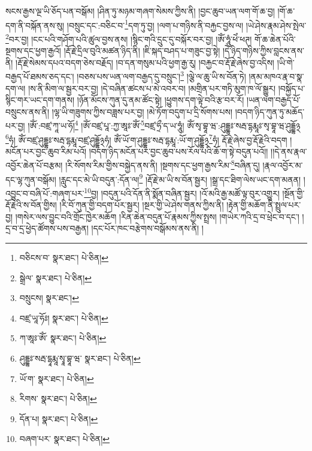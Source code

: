 སངས་རྒྱས་ལྔ་ཡི་ཅོད་པན་བསྒོམ། །ཤིན་ཏུ་མཉམ་གཞག་སེམས་ཀྱིས་ནི། །བྱང་ཆུབ་ཡན་ལག་གོ་ཆ་བྱ། །གོ་ཆ་དག་ནི་བསྐོན་ནས་སུ། །བསྲུང་དང་:བཅིང་བ་\footnote{བཅིངས་བ་  སྣར་ཐང་།  པེ་ཅིན། }དག་ཏུ་བྱ། །ལག་པ་གཉིས་ནི་བརྐྱང་བྱས་ལ། །ཡེ་ཤེས་རྣམ་ཤེས་སྤེལ་\footnote{སྒྲེལ་  སྣར་ཐང་།  པེ་ཅིན། }བར་བྱ། །ངང་པའི་གཤོག་པའི་ཚུལ་བྱས་ནས། །སྙིང་གའི་དྲུང་དུ་བསྐོར་བར་བྱ། །ཨོཾ་ཧཱུཾ་ཕེཾ་ཕཊ། གོ་ཆ་ཆེན་པོའི་སྔགས་དང་ཕྱག་རྒྱའོ། །རྡོ་རྗེ་དྲིལ་བུའི་མཚན་ཉིད་ནི། །ཇི་སྐད་བཤད་པ་གཟུང་བྱ་སྟེ། །དེ་ཉིད་གཉིས་ཀྱིས་བླངས་ནས་ནི། །རྡོ་རྗེ་སེམས་དཔའ་བདག་ཅེས་བརྗོད། །བ་དན་གསུམ་པའི་ཕྱག་རྒྱ་རུ། །བརྐྱང་བ་རྡོ་རྗེ་ཞེས་བྱ་འདིས། །ཡི་གེ་བརྒྱད་པོ་ཐམས་ཅད་དང་། །བཅས་པས་ཡན་ལག་བརྒྱད་དུ་བསྲུང་།\footnote{བསྲུངས།  སྣར་ཐང་། } །ལྕེ་ལ་ཆུ་ཡི་ས་བོན་ཏེ། །ནམ་མཁའ་རྣ་བ་སྣ་དག་ལ། །ས་ནི་མིག་ལ་སྦྱར་བར་བྱ། །དེ་བཞིན་ཚངས་པ་མེ་འབར་བ། །མགྲིན་པར་གཏི་མུག་ཁ་ལོ་སྒྱུར། །བསྐྱོད་པ་སྙིང་གར་ཡང་དག་གནས། །ཉོན་མོངས་ཀུན་དུ་ནམ་ཚོང་སྟེ། །ཕྱུགས་དག་ལྟེ་བའི་རྩ་བར་རོ། །ཡན་ལག་བརྒྱད་པོ་བསྲུངས་ནས་ནི། །ལྷ་ཡི་གཟུགས་ཀྱིས་བཟླས་པར་བྱ། །མེ་ཏོག་བདུག་པ་དྲི་སོགས་པས། །བདག་ཉིད་ཀུན་ཏུ་མཆོད་པར་བྱ། །ཨོཾ་:བཛྲ་ཀཱ་ཡ་ཧོ།\footnote{བཛྲ་ཡཱ་ཧོཿ།  སྣར་ཐང་།  པེ་ཅིན། } །ཨོཾ་བཛྲ་པཱ་:ཀྱ་ཨཱཿ་ཨོཾ་\footnote{ཀ་ཨཱཿ་ཨོཾ་  སྣར་ཐང་།  པེ་ཅིན། }བཛྲ་ཧྲྀ་ད་ཡ་ཧཱུཾ། ཨོཾ་སྭ་བྷཱ་ཝ་:ཤུདྡྷཿ་སརྦ་དྷརྨཱཿ་སྭ་བྷཱ་ཝ་ཤུདྡྷོ྅\footnote{ཤུདྡྷཿ་སརྦ་དྷཱརྨཱ་སྭཱ་བྷཱ་ཝ་  སྣར་ཐང་།  པེ་ཅིན། }ཧཾ། ཨོཾ་བཛྲ་ཤུདྡྷཿ་སརྦ་དྷརྨཱ་བཛྲ་ཤུདྡྷོ྅ཧཾ། ཨོཾ་ཡོ་ག་ཤུདྡྷཿ་སརྦ་དྷརྨཱ་:ཡོ་ག་ཤུདྡྷོ྅\footnote{ཡོ་ག་  སྣར་ཐང་།  པེ་ཅིན། }ཧཾ། རྡོ་རྗེ་ཞེས་བྱ་རྡོ་རྗེའི་བདག །མངོན་པར་བྱང་ཆུབ་རིམ་པའོ། །བདག་ཉིད་མངོན་པར་བྱང་ཆུབ་པས་རོལ་པའི་ཆོ་ག་སྟེ་བདུན་པའོ།། །།དེ་ནས་རྣལ་འབྱོར་ཆེན་པོ་བརྩམ། །རི་སོགས་རིམ་གྱིས་བསྐྱེད་ནས་ནི། །སྔགས་དང་ཕྱག་རྒྱས་རིམ་\footnote{རིགས་  སྣར་ཐང་།  པེ་ཅིན། }བཞིན་དུ། །རྣལ་འབྱོར་མ་དང་ལྷ་ཀུན་བསྒོམ། །རླུང་དང་མེ་ཡི་བདུན་:དོན་ལ།\footnote{དོན་པ།  སྣར་ཐང་།  པེ་ཅིན། } །རྡོ་རྗེ་མ་ཡི་ས་བོན་སྦྱར། །སྒྲ་དང་ཐིག་ལེས་ཡང་དག་མནན། །འབྱུང་བ་བཞི་པོ་:གཞག་པར་\footnote{བཞག་པར་  སྣར་ཐང་།  པེ་ཅིན། }བྱ། །བདུན་པའི་དོན་ནི་སྨོན་བཞིན་སྦྱར། །འོ་མའི་རྒྱ་མཚོ་ལྟ་བུར་འགྱུར། །སྔོན་གྱི་རྡོ་རྗེའི་ས་བོན་གྱིས། །རི་བོ་ཀུན་གྱི་བདག་པོར་སྦྱར། །སྔར་གྱི་ཡེ་ཤེས་གནས་ཀྱིས་ནི། །རྟེན་གྱི་མཆོག་ནི་སྤྲུལ་པར་བྱ། །གསེར་ལས་བྱུང་བའི་གྲོང་ཁྱེར་མཆོག །རིན་ཆེན་བདུན་པོ་རྣམས་ཀྱིས་སྤྲས། །གཡེར་ཀའི་དྲ་བ་ཕྲེང་བ་དང་། །དྲ་བ་དྲ་ཕྱེད་ཚོགས་པས་བརྒྱན། །དང་པོར་ཁང་བརྩེགས་བསྒོམས་ནས་ནི། །
